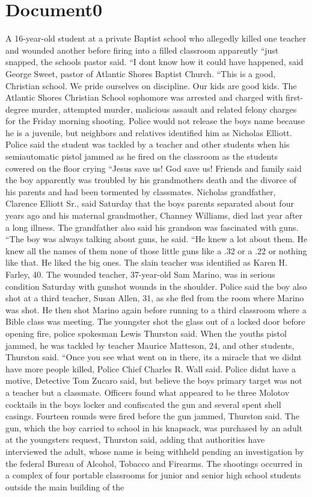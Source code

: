 \documentclass{article}
\begin{document}
\color[rgb]{0,0,0}\section{Document0}
\color[rgb]{0.29411764705882354,0.3686274509803922,0.5058823529411764}A 16-year-old student at a private Baptist school who allegedly killed one teacher and wounded another before firing into a filled classroom apparently ``just snapped, the schools pastor said. ``I dont know how it could have happened, said George Sweet, pastor of Atlantic Shores Baptist Church. ``This is a good, Christian school. We pride ourselves on discipline. Our kids are good kids. The Atlantic Shores Christian School sophomore was arrested and charged with first-degree murder, attempted murder, malicious assault and related felony charges for the Friday morning shooting. Police would not release the boys name because he is a juvenile, but neighbors and relatives identified him as Nicholas Elliott. Police said the student was tackled by a teacher and other students when his semiautomatic pistol jammed as he fired on the classroom as the students cowered on the floor crying ``Jesus save us! God save us! Friends and family said the boy apparently was troubled by his grandmothers death and the divorce of his parents and had been tormented by classmates. Nicholas grandfather, Clarence Elliott Sr., said Saturday that the boys parents separated about four years ago and his maternal grandmother, Channey Williams, died last year after a long illness. The grandfather also said his grandson was fascinated with guns. ``The boy was always talking about guns, he said. ``He knew a lot about them. He knew all the names of them  none of those little guns like a .32 or a .22 or nothing like that. He liked the big ones. The slain teacher was identified as Karen H. Farley, 40. The wounded teacher, 37-year-old Sam Marino, was in serious condition Saturday with gunshot wounds in the shoulder. Police said the boy also shot at a third teacher, Susan Allen, 31, as she fled from the room where Marino was shot. He then shot Marino again before running to a third classroom where a Bible class was meeting. The youngster shot the glass out of a locked door before opening fire, police spokesman Lewis Thurston said. When the youths pistol jammed, he was tackled by teacher Maurice Matteson, 24, and other students, Thurston said. ``Once you see what went on in there, its a miracle that we didnt have more people killed, Police Chief Charles R. Wall said. Police didnt have a motive, Detective Tom Zucaro said, but believe the boys primary target was not a teacher but a classmate. Officers found what appeared to be three Molotov cocktails in the boys locker and confiscated the gun and several spent shell casings. Fourteen rounds were fired before the gun jammed, Thurston said. The gun, which the boy carried to school in his knapsack, was purchased by an adult at the youngsters request, Thurston said, adding that authorities have interviewed the adult, whose name is being withheld pending an investigation by the federal Bureau of Alcohol, Tobacco and Firearms. The shootings occurred in a complex of four portable classrooms for junior and senior high school students outside the main building of the 
\end{document}
